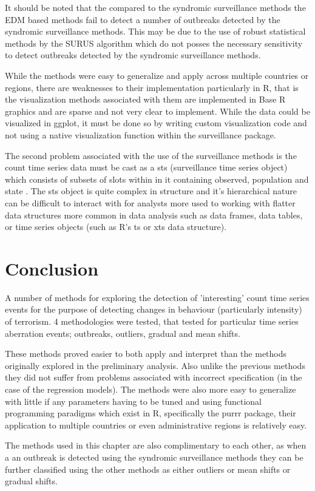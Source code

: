 It should be noted that the compared to the syndromic surveillance methods the EDM based methods fail to detect a number of outbreaks detected by the syndromic surveillance methods. This may be due to the use of robust statistical methods by the SURUS algorithm which do not posses the necessary sensitivity to detect outbreaks detected by the syndromic surveillance methods. 

While the methods were easy to generalize and apply across multiple countries or regions, there are weaknesses to their implementation particularly in R, that is the visualization methods associated with them are implemented in Base R graphics and are sparse and not very clear to implement. While the data could be visualized in ggplot, it must be done so by writing custom visualization code and not using a native visualization function within the surveillance package. 

The second problem associated with the use of the surveillance methods is the count time series data must be cast as a sts (surveillance time series object) which consists of subsets of slots within in it containing observed, population and state \citep{hohle2007r}. The sts object is quite complex in structure and it’s hierarchical nature can be difficult to interact with for analysts more used to working with flatter data structures more common in data analysis such as data frames, data tables, or time series objects (such as R’s ts or xts data structure).

\section{Conclusion}

A number of methods for exploring the detection of 'interesting' count time series events for the purpose of detecting changes in behaviour (particularly intensity) of terrorism. 4 methodologies were tested, that tested for particular time series aberration events; outbreaks, outliers, gradual and mean shifts.  

These methods proved easier to both apply and interpret than the methods originally explored in the preliminary analysis. Also unlike the previous methods they did not suffer from problems associated with incorrect specification (in the case of the regression models). The methods were also more easy to generalize with little if any parameters having to be tuned and using functional programming paradigms which exist in R, specifically the purrr package, their application to multiple countries or even administrative regions is relatively easy.

The methods used in this chapter are also complimentary to each other, as when a an outbreak is detected using the syndromic surveillance methods they can be further classified using the other methods as either outliers or mean shifts or gradual shifts.
